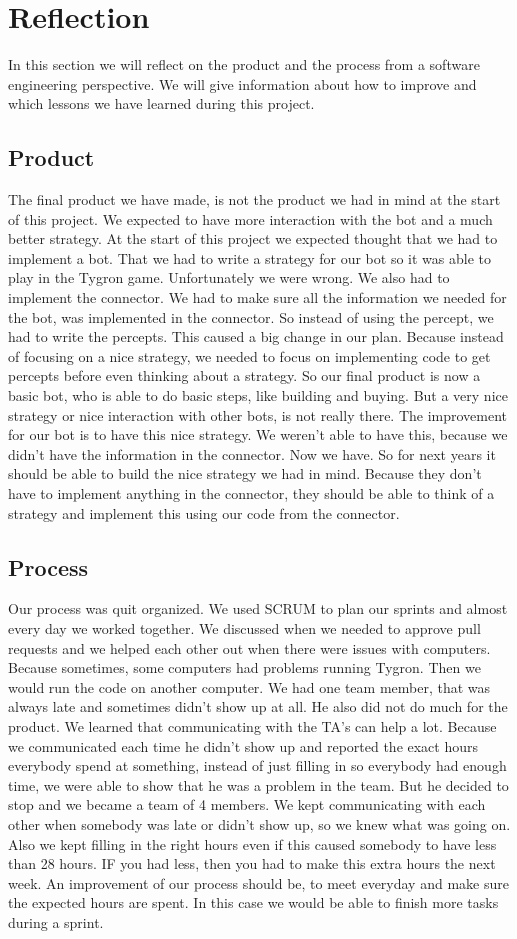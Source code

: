 \section{Reflection}
In this section we will reflect on the product and the process from a software engineering perspective. We will give information about how to improve and which lessons we have learned during this project.
\subsection{Product}
The final product we have made, is not the product we had in mind at the start of this project. We expected to have more interaction with the bot and a much better strategy. At the start of this project we expected thought that we had to implement a bot. That we had to write a strategy for our bot so it was able to play in the Tygron game. Unfortunately we were wrong. We also had to implement the connector. We had to make sure all the information we needed for the bot, was implemented in the connector. So instead of using the percept, we had to write the percepts. This caused a big change in our plan. Because instead of focusing on a nice strategy, we needed to focus on implementing code to get percepts before even thinking about a strategy. So our final product is now a basic bot, who is able to do basic steps, like building and buying. But a very nice strategy or nice interaction with other bots, is not really there. The improvement for our bot is to have this nice strategy. We weren't able to have this, because we didn't have the information in the connector. Now we have. So for next years it should be able to build the nice strategy we had in mind. Because they don't have to implement anything in the connector, they should be able to think of a strategy and implement this using our code from the connector.

\subsection{Process}
Our process was quit organized. We used SCRUM to plan our sprints and almost every day we worked together. We discussed when we needed to approve pull requests and we helped each other out when there were issues with computers. Because sometimes, some computers had problems running Tygron. Then we would run the code on another computer. We had one team member, that was always late and sometimes didn't show up at all. He also did not do much for the product. We learned that communicating with the TA's can help a lot. Because we communicated each time he didn't show up and reported the exact hours everybody spend at something, instead of just filling in so everybody had enough time, we were able to show that he was a problem in the team. But he decided to stop and we became a team of 4 members. We kept communicating with each other when somebody was late or didn't show up, so we knew what was going on. Also we kept filling in the right hours even if this caused somebody to have less than 28 hours. IF you had less, then you had to make this extra hours the next week.
An improvement of our process should be, to meet everyday and make sure the expected hours are spent. In this case we would be able to finish more tasks during a sprint.
\newpage
	